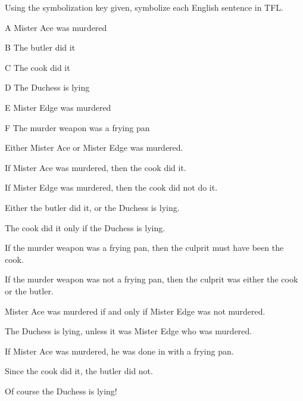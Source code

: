 \problempart Using the symbolization key given, symbolize each English sentence in TFL.
\begin{ekey}
\item[A] Mister Ace was murdered
\item[B] The butler did it
\item[C] The cook did it
\item[D] The Duchess is lying
\item[E] Mister Edge was murdered
\item[F] The murder weapon was a frying pan
\end{ekey}
\begin{compactlist}
\item Either Mister Ace or Mister Edge was murdered.
\item[] 
\item If Mister Ace was murdered, then the cook did it.
\item[] 
\item If Mister Edge was murdered, then the cook did not do it.
\item[] 
\item Either the butler did it, or the Duchess is lying.
\item[] 
\item The cook did it only if the Duchess is lying.
\item[] 
\item If the murder weapon was a frying pan, then the culprit must have been the cook.
\item[] 
\item If the murder weapon was not a frying pan, then the culprit was either the cook or the butler.
\item[] 
\item Mister Ace was murdered if and only if Mister Edge was not murdered.
\item[] 
\item The Duchess is lying, unless it was Mister Edge who was murdered.
\item[] 
\item If Mister Ace was murdered, he was done in with a frying pan.
\item[] 
\item Since the cook did it, the butler did not.
\item[] 
\item Of course the Duchess is lying!
\item[] 
\end{compactlist}

